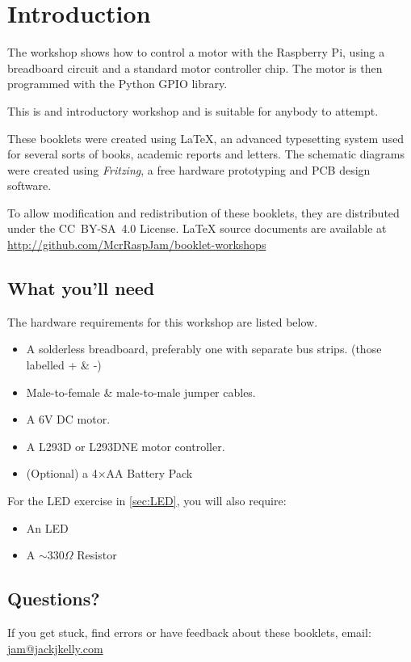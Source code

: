 \setcounter{section}{-1}
\section{Introduction}
	
	
	The workshop shows how to control a motor with the Raspberry Pi, using a breadboard circuit and a standard motor controller chip. The motor is then programmed with the Python GPIO library.

	This is and introductory workshop and is suitable for anybody to attempt.
		
	These booklets were created using {\selectfont \LaTeX}, an advanced typesetting system used for several sorts of books, academic reports and letters. The schematic diagrams were created using \textit{Fritzing}, a free hardware prototyping and PCB design software.
		
	To allow modification and redistribution of these booklets, they are distributed under the \hbox{CC BY-SA 4.0} License. LaTeX source documents are available at \url{http://github.com/McrRaspJam/booklet-workshops}
	
	
	\subsection*{What you'll need}
		
			
		The hardware requirements for this workshop are listed below.
	
		\begin{itemize}[noitemsep]		
			\item A solderless breadboard, preferably one with separate bus strips. (those labelled + \& -)
			\item Male-to-female \& male-to-male jumper cables.
			\item A 6V DC motor.
			\item A L293D or L293DNE motor controller.
			\item (Optional) a 4$\times$AA Battery Pack				
		\end{itemize}
		
		\newpage																					%
		For the LED exercise in \autoref{sec:LED}, you will also require:
			
		\begin{itemize}[noitemsep]	
			\item An LED
			\item A $\sim 330 \Omega$ Resistor
		\end{itemize}
				
	
		
			
	
	
		
	\subsection*{Questions?}
		If you get stuck, find errors or have feedback about these booklets, email:
		\url{jam@jackjkelly.com}\label{email}